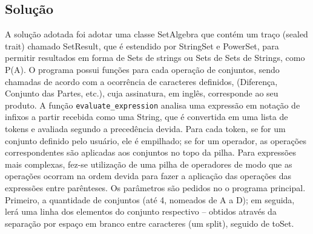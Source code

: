 \documentclass[a4paper, 11pt]{scrartcl}
\begin{document}
\subsection*{Solução}
A solução adotada foi adotar uma classe SetAlgebra que contém um traço (sealed trait) chamado SetResult, que é
estendido por StringSet e PowerSet, para permitir resultados em forma de Sets de strings ou Sets de Sets de Strings, como P(A). 
O programa possui funções para cada operação de conjuntos, sendo chamadas de acordo com a ocorrência de caracteres definidos, 
(Diferença, Conjunto das Partes, etc.), cuja assinatura, em inglês, corresponde ao seu produto. A função 
\texttt{evaluate\_expression} analisa uma expressão em notação de infixos a partir recebida como uma String, que é convertida em uma
lista de tokens e avaliada segundo a precedência devida. Para cada token, se for um conjunto definido pelo usuário, 
ele é empilhado; se for um operador, as operações correspondentes são aplicadas aos conjuntos no topo da pilha. 
Para expressões mais complexas, fez-se utilização de uma pilha de operadores de modo que as operações ocorram na ordem devida
para fazer a aplicação das operações das expressões entre parênteses. 
Os parâmetros são pedidos no o programa principal. Primeiro, a quantidade de conjuntos (até 4, nomeados de A a D); em seguida, 
lerá uma linha dos elementos do conjunto respectivo -- obtidos através da separação por espaço em branco entre 
caracteres (um split), seguido de toSet.
\end{document}

